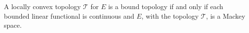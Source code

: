 A locally convex topology $\mathcal{T}$ for $E$ is a bound topology if and only if each bounded linear functional is continuous and $E$, with the topology $\mathcal{T}$, is a Mackey space.
